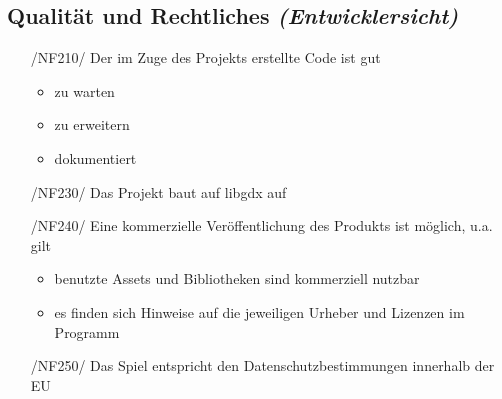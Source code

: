 \subsection{Qualität und Rechtliches \textit{(Entwicklersicht)}}
\begin{itemize}
	\item[/NF210/] Der im Zuge des Projekts erstellte Code ist gut
		\begin{itemize}
			\item zu warten
			\item zu erweitern
			\item dokumentiert
		\end{itemize}
	\item[/NF230/] Das Projekt baut auf libgdx auf
	\item[/NF240/] Eine kommerzielle Veröffentlichung des Produkts ist möglich, u.a. gilt
		\begin{itemize}
			\item benutzte Assets und Bibliotheken sind kommerziell nutzbar
			\item es finden sich Hinweise auf die jeweiligen Urheber und Lizenzen im Programm
		\end{itemize}
	\item[/NF250/] Das Spiel entspricht den Datenschutzbestimmungen innerhalb der EU
\end{itemize}
